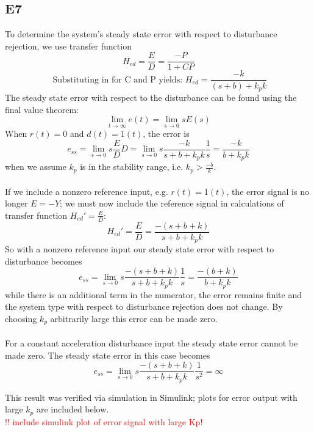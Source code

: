 \documentclass[11pt,titlepage]{article}
\begin{document}
	\subsection*{E7}
		To determine the system's steady state error with respect to disturbance rejection, we use transfer function 
		\begin{equation}
			H_{ed}=\frac{E}{D}=\frac{-P}{1+CP}
		\end{equation}
		\begin{equation}\label{eq:propHed}
			\mbox{ Substituting in for C and P yields: } H_{ed}=\frac{-k}{(s+b)+k_pk}
		\end{equation}
		The steady state error with respect to the disturbance can be found using the final value theorem: 
		\begin{equation}
			\lim_{t\to\infty}e(t)=\lim_{s\to0}sE(s)
		\end{equation}
		When $r(t)=0$ and $d(t)=1(t)$, the error is
		\begin{equation}
			e_{ss}=\lim_{s\to0}s\frac{E}{D}D=\lim_{s\to0}s\frac{-k}{s+b+k_pk}\frac{1}{s}=\frac{-k}{b+k_pk}
		\end{equation}
		when we assume $k_p$ is in the stability range, i.e. $k_p > \frac{-b}{k}$. \\\\
		If we include a nonzero reference input, e.g. $r(t)=1(t)$, the error signal is no longer $E=-Y$; we must now include the reference signal in calculations of transfer function $H_{ed}'=\frac{E}{D}$:
		\begin{equation}
			H_{ed}'=\frac{E}{D}=\frac{-(s+b+k)}{s+b+k_pk}
		\end{equation}
		So with a nonzero reference input our steady state error with respect to disturbance becomes
		\begin{equation}
			e_{ss}=\lim_{s\to0}s\frac{-(s+b+k)}{s+b+k_pk}\frac{1}{s}=\frac{-(b+k)}{b+k_pk}
			\end{equation}
		while there is an additional term in the numerator, the error remains finite and the system type with respect to disturbance rejection does not change. By choosing $k_p$ arbitrarily large this error can be made zero.\\\\
		
		For a constant acceleration disturbance input the steady state error cannot be made zero. The steady state error in this case becomes
		$$e_{ss}=\lim_{s\to0}s\frac{-(s+b+k)}{s+b+k_pk}\frac{1}{s^2} =\infty$$
		
		This result was verified via simulation in Simulink; plots for error output with large $k_p$ are included below. \\
		\textcolor{red}{!! include simulink plot of error signal with large Kp!}
		
\end{document}
